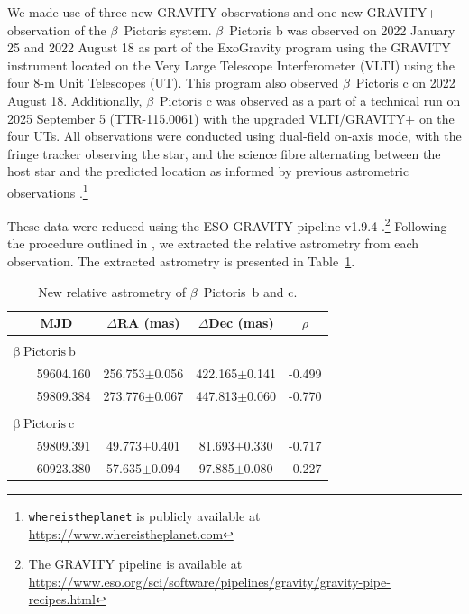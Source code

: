 \documentclass{aa}
\begin{document}
We made use of three new GRAVITY observations and one new GRAVITY+ observation of the $\beta$~Pictoris system.
%
$\beta$~Pictoris b was observed on 2022 January 25 and 2022 August 18 as part of the ExoGravity program \citep[1104.C-0651;][]{Lacour_2020} using the GRAVITY instrument \citep{GRAVITY_Collaboration_2017} located on the Very Large Telescope Interferometer (VLTI) using the four 8-m Unit Telescopes (UT).
%
This program also observed $\beta$~Pictoris c on 2022 August 18.
%
Additionally, $\beta$~Pictoris c was observed as a part of a technical run on 2025 September 5 (TTR-115.0061) with the upgraded VLTI/GRAVITY+ \citep{GRAVITY+_Collaboration_2025} on the four UTs.
%
All observations were conducted using dual-field on-axis mode, with the fringe tracker observing the star, and the science fibre alternating between the host star and the predicted location as informed by previous astrometric observations \citep{Wang_2021}.\footnote{\texttt{whereistheplanet} is publicly available at \href{https://www.whereistheplanet.com}{https://www.whereistheplanet.com}} 

These data were reduced using the ESO GRAVITY pipeline v1.9.4 \citep{Lapeyrere_2014}.\footnote{The GRAVITY pipeline is available at \href{https://www.eso.org/sci/software/pipelines/gravity/gravity-pipe-recipes.html}{https://www.eso.org/sci/software/pipelines/gravity/gravity-pipe-recipes.html}} Following the procedure outlined in \citet{kammerer_2025}, we extracted the relative astrometry from each observation.
%
The extracted astrometry is presented in Table~\ref{tab:new_astrometry}.

\begin{table}
\caption{New relative astrometry of $\beta$~Pictoris~b and c. }
\label{tab:new_astrometry}
\centering
\begin{tabular}{l c c c}
\hline 
~~~ MJD & $\Delta$RA (mas) & $\Delta$Dec (mas) & $\rho$\\
\hline \hline \\[-0.3cm]
$\mathrm{\beta~Pictoris~b}$ & & & \\
~~~ 59604.160 & 256.753$\pm$0.056 & 422.165$\pm$0.141 & -0.499\\
~~~ 59809.384 & 273.776$\pm$0.067 & 447.813$\pm$0.060 & -0.770\\
\hline\\[-0.3cm]
$\mathrm{\beta~Pictoris~c}$ & & & \\
~~~ 59809.391 & 49.773$\pm$0.401 & 81.693$\pm$0.330 & -0.717\\
~~~ 60923.380 & 57.635$\pm$0.094 & 97.885$\pm$0.080 & -0.227\\
\hline
\end{tabular}
\end{table}
\end{document}
